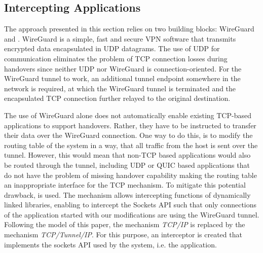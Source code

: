 \subsection{Intercepting Applications}
The approach presented in this section relies on two building blocks: WireGuard and \ld.
WireGuard is a simple, fast and secure VPN software that transmits encrypted data encapsulated in UDP datagrams.
The use of UDP for communication eliminates the problem of TCP connection losses during handovers since neither UDP nor WireGuard is connection-oriented.
For the WireGuard tunnel to work, an additional tunnel endpoint somewhere in the network is required, at which the WireGuard tunnel is terminated and the encapsulated TCP connection further relayed to the original destination.

The use of WireGuard alone does not automatically enable existing TCP-based applications to support handovers.
Rather, they have to be instructed to transfer their data over the WireGuard connection.
One way to do this, is to modify the routing table of the system in a way, that all traffic from the host is sent over the tunnel.
However, this would mean that non-TCP based applications would also be routed through the tunnel, including UDP or QUIC based applications that do not have the problem of missing handover capability making the routing table an inappropriate interface for the TCP mechanism.
To mitigate this potential drawback, \ld is used.
The \ld mechanism allows intercepting functions of dynamically linked libraries, enabling to intercept the Sockets API such that only connections of the application started with our \ld modifications are using the WireGuard tunnel.
Following the model of this paper, the mechanism \emph{TCP/IP} is replaced by the mechanism \emph{TCP/Tunnel/IP}. 
For this purpose, an interceptor is created that implements the sockets API used by the system, i.e. the application.

